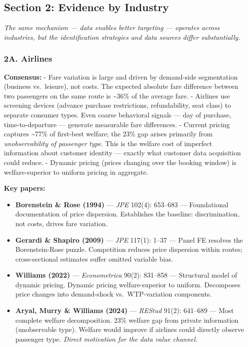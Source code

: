 \documentclass[
]{article}
\providecommand{\tightlist}{%
  \setlength{\itemsep}{0pt}\setlength{\parskip}{0pt}}
\begin{document}
\hypertarget{section-2-evidence-by-industry}{%
\subsection{Section 2: Evidence by
Industry}\label{section-2-evidence-by-industry}}

\emph{The same mechanism --- data enables better targeting --- operates
across industries, but the identification strategies and data sources
differ substantially.}

\hypertarget{a.-airlines}{%
\subsubsection{2A. Airlines}\label{a.-airlines}}

\textbf{Consensus:} - Fare variation is large and driven by demand-side
segmentation (business vs.~leisure), not costs. The expected absolute
fare difference between two passengers on the same route is
\textasciitilde36\% of the average fare. - Airlines use screening
devices (advance purchase restrictions, refundability, seat class) to
separate consumer types. Even coarse behavioral signals --- day of
purchase, time-to-departure --- generate measurable fare differences. -
Current pricing captures \textasciitilde77\% of first-best welfare; the
23\% gap arises primarily from \emph{unobservability of passenger type}.
This is the welfare cost of imperfect information about customer
identity --- exactly what customer data acquisition could reduce. -
Dynamic pricing (prices changing over the booking window) is
welfare-superior to uniform pricing in aggregate.

\textbf{Key papers:}

\begin{itemize}
\tightlist
\item
  \textbf{Borenstein \& Rose (1994)} --- \emph{JPE} 102(4): 653--683 ---
  Foundational documentation of price dispersion. Establishes the
  baseline: discrimination, not costs, drives fare variation.
\item
  \textbf{Gerardi \& Shapiro (2009)} --- \emph{JPE} 117(1): 1--37 ---
  Panel FE resolves the Borenstein-Rose puzzle. Competition reduces
  price dispersion within routes; cross-sectional estimates suffer
  omitted variable bias.
\item
  \textbf{Williams (2022)} --- \emph{Econometrica} 90(2): 831--858 ---
  Structural model of dynamic pricing. Dynamic pricing welfare-superior
  to uniform. Decomposes price changes into demand-shock
  vs.~WTP-variation components.
\item
  \textbf{Aryal, Murry \& Williams (2024)} --- \emph{REStud} 91(2):
  641--689 --- Most complete welfare decomposition. 23\% welfare gap
  from private information (unobservable type). Welfare would improve if
  airlines could directly observe passenger type. \emph{Direct
  motivation for the data value channel.}
\end{itemize}
\end{document}
